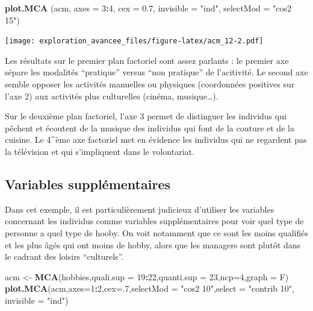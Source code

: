 \documentclass[]{book}
\newenvironment{Shaded}{\begin{snugshade}}{\end{snugshade}}
\newcommand{\DataTypeTok}[1]{\textcolor[rgb]{0.13,0.29,0.53}{#1}}
\newcommand{\DecValTok}[1]{\textcolor[rgb]{0.00,0.00,0.81}{#1}}
\newcommand{\FloatTok}[1]{\textcolor[rgb]{0.00,0.00,0.81}{#1}}
\newcommand{\KeywordTok}[1]{\textcolor[rgb]{0.13,0.29,0.53}{\textbf{#1}}}
\newcommand{\NormalTok}[1]{#1}
\newcommand{\OperatorTok}[1]{\textcolor[rgb]{0.81,0.36,0.00}{\textbf{#1}}}
\newcommand{\StringTok}[1]{\textcolor[rgb]{0.31,0.60,0.02}{#1}}
\begin{document}
\begin{Shaded}
\begin{Highlighting}[]
\KeywordTok{plot.MCA}\NormalTok{ (acm, }\DataTypeTok{axes =} \DecValTok{3}\OperatorTok{:}\DecValTok{4}\NormalTok{, }\DataTypeTok{cex =} \FloatTok{0.7}\NormalTok{, }\DataTypeTok{invisible =} \StringTok{"ind"}\NormalTok{, }\DataTypeTok{selectMod =} \StringTok{"cos2 15"}\NormalTok{)}
\end{Highlighting}
\end{Shaded}

\texttt{[image: exploration\_avancee\_files/figure-latex/acm\_12-2.pdf]}

Les résultats sur le premier plan factoriel sont assez parlants : le premier axe sépare les modalités ``pratique'' versus ``non pratique'' de l'acitivité. Le second axe semble opposer les activités manuelles ou physiques (coordonnées positives sur l'axe 2) aux activités plus culturelles (cinéma, musique\ldots{}).

Sur le deuxième plan factoriel, l'axe 3 permet de distinguer les individus qui pêchent et écoutent de la musique des individus qui font de la couture et de la cuisine. Le 4\^{}ème axe factoriel met en évidence les individus qui ne regardent pas la télévision et qui s'impliquent dans le volontariat.

\hypertarget{variables-supplementaires}{%
\subsection{Variables supplémentaires}\label{variables-supplementaires}}

Dans cet exemple, il est particulièrement judicieux d'utiliser les variables concernant les individus comme variables supplémentaires pour voir quel type de personne a quel type de hooby. On voit notamment que ce sont les moins qualifiés et les plus âgés qui ont moins de hobby, alors que les managers sont plutôt dans le cadrant des loisirs ``culturels''.

\begin{Shaded}
\begin{Highlighting}[]
\NormalTok{acm <-}\StringTok{ }\KeywordTok{MCA}\NormalTok{(hobbies,}\DataTypeTok{quali.sup =} \DecValTok{19}\OperatorTok{:}\DecValTok{22}\NormalTok{,}\DataTypeTok{quanti.sup =} \DecValTok{23}\NormalTok{,}\DataTypeTok{ncp=}\DecValTok{4}\NormalTok{,}\DataTypeTok{graph =}\NormalTok{ F)}
\KeywordTok{plot.MCA}\NormalTok{(acm,}\DataTypeTok{axes=}\DecValTok{1}\OperatorTok{:}\DecValTok{2}\NormalTok{,}\DataTypeTok{cex=}\NormalTok{.}\DecValTok{7}\NormalTok{,}\DataTypeTok{selectMod =} \StringTok{"cos2 10"}\NormalTok{,}\DataTypeTok{select =} \StringTok{"contrib 10"}\NormalTok{, }\DataTypeTok{invisible =} \StringTok{"ind"}\NormalTok{)}
\end{Highlighting}
\end{Shaded}
\end{document}
